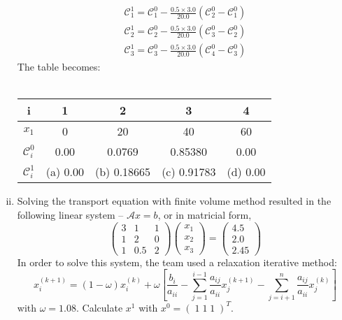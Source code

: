 \documentclass[calculator,steamtables,refrigeranttables,psychrometricchart,datasheet,solutions]{exam}
\begin{document}
\begin{question}
\begin{enumerate}[(i)]
{\begin{eqnarray}
\mathcal{C}_{1}^{1}=\mathcal{C}_{1}^{0} - \frac{0.5 \times 3.0}{20.0} \left(\mathcal{C}_{2}^{0}-\mathcal{C}_{1}^{0}\right) \nonumber \\
\mathcal{C}_{2}^{1}=\mathcal{C}_{2}^{0} - \frac{0.5 \times 3.0}{20.0} \left(\mathcal{C}_{3}^{0}-\mathcal{C}_{2}^{0}\right) \nonumber \\
\mathcal{C}_{3}^{1}=\mathcal{C}_{3}^{0} - \frac{0.5 \times 3.0}{20.0} \left(\mathcal{C}_{4}^{0}-\mathcal{C}_{3}^{0}\right) \nonumber
\end{eqnarray}
The table becomes:\\~
\begin{center}
\begin{tabular}{||c | c c c c ||}
\hline\hline
{\bf i} & 1   & 2    & 3    &  4   \\
\hline\hline
$x_{1}$ & 0    &  20  & 40   & 60   \\
$\mathcal{C}_{i}^{0}$ &  0.00 & 0.0769  &  0.85380  & 0.00  \\
$\mathcal{C}_{i}^{1}$ & (a) 0.00 & (b) 0.18665 & (c) 0.91783 & (d) 0.00 \\
\hline\hline
\end{tabular}%
\end{center}
}

\item Solving the transport equation with finite volume method resulted in the following linear system -- $\mathcal{A}x=b$, or in matricial form,
\[
\begin{pmatrix} 3 & 1 & 1 \\ 1 & 2 & 0 \\ 1 & 0.5 & 2 \end{pmatrix}
\begin{pmatrix} x_{1} \\ x_{2} \\ x_{3} \end{pmatrix} =
\begin{pmatrix} 4.5 \\ 2.0 \\ 2.45 \end{pmatrix}
\]
In order to solve this system, the team used a relaxation iterative method:
\begin{displaymath}
x_{i}^{(k+1)} = \left(1 - \omega\right) x_{i}^{(k)} + \omega \left[ \frac{b_{i}}{a_{ii}} - \sum\limits_{j=1}^{i-1} \frac{a_{ij}}{a_{ii}}x_{j}^{(k+1)} - \sum\limits_{j=i+1}^{n} \frac{a_{ij}}{a_{ii}}x_{j}^{(k)}\right]
\end{displaymath}
with $\omega=1.08$. Calculate $x^{1}$ with $x^{0}=\left(\;1 \; 1 \; 1\;\right)^{T}$.~

\end{enumerate}

\end{question}
\end{document}
